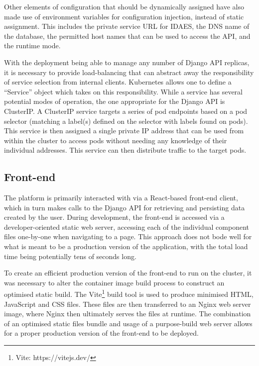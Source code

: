 Other elements of configuration that should be dynamically assigned have also made use of environment variables for configuration injection, instead of static assignment. This includes the private service URL for IDAES, the DNS name of the database, the permitted host names that can be used to access the API, and the runtime mode.

With the deployment being able to manage any number of Django API replicas, it is necessary to provide load-balancing that can abstract away the responsibility of service selection from internal clients. Kubernetes allows one to define a ``Service'' object which takes on this responsibility. While a service has several potential modes of operation, the one appropriate for the Django API is ClusterIP. A ClusterIP service targets a series of pod endpoints based on a pod selector (matching a label(s) defined on the selector with labels found on pods). This service is then assigned a single private IP address that can be used from within the cluster to access pods without needing any knowledge of their individual addresses. This service can then distribute traffic to the target pods.


\subsection{Front-end}

The platform is primarily interacted with via a React-based front-end client, which in turn makes calls to the Django API for retrieving and persisting data created by the user. During development, the front-end is accessed via a developer-oriented static web server, accessing each of the individual component files one-by-one when navigating to a page. This approach does not bode well for what is meant to be a production version of the application, with the total load time being potentially tens of seconds long.

To create an efficient production version of the front-end to run on the cluster, it was necessary to alter the container image build process to construct an optimised static build. The Vite\footnote{Vite: https://vitejs.dev/} build tool is used to produce minimised HTML, JavaScript and CSS files. These files are then transferred to an Nginx web server image, where Nginx then ultimately serves the files at runtime. The combination of an optimised static files bundle and usage of a purpose-build web server allows for a proper production version of the front-end to be deployed.

